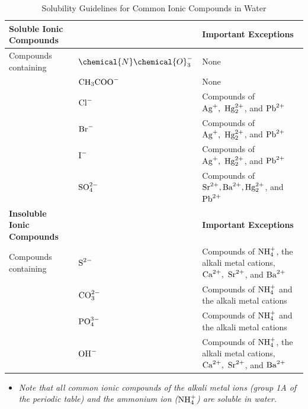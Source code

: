 \documentclass[
	chapter=4
]{chem122notes}
\begin{document}
\begin{table}[H]
	\centering
	\caption{Solubility Guidelines for Common Ionic Compounds in Water}
	\label{tab:ionic-compound-solubility-guidelines}
	\begin{tabular}{l l l}
		\textbf{Soluble Ionic Compounds} & & \textbf{Important Exceptions}\\
		\hline
		Compounds containing & $\chemical{N}\chemical{O}_{3}^{-}$ & None\\
		 & $\element{C}\element{H}[3]\element{C}\element{O}\element{O}^{-}$ & None\\
		 & $\element{Cl}^{-}$ & Compounds of $\element{Ag}^{+},\ \element{Hg}[2]^{2+}$, and $\element{Pb}^{2+}$\\
		 & $\element{Br}^{-}$ & Compounds of $\element{Ag}^{+},\ \element{Hg}[2]^{2+}$, and $\element{Pb}^{2+}$\\
		 & $\element{I}^{-}$ & Compounds of $\element{Ag}^{+},\ \element{Hg}[2]^{2+}$, and $\element{Pb}^{2+}$\\
		 & $\element{S}\element{O}[4]^{2-}$ & Compounds of $\element{Sr}^{2+}, \element{Ba}^{2+}, \element{Hg}[2]^{2+}$, and $\element{Pb}^{2+}$\\
		\hline
		\textbf{Insoluble Ionic Compounds} & & \textbf{Important Exceptions}\\
		\hline
		Compounds containing & $\element{S}^{2-}$ & Compounds of $\element{N}\element{H}_{4}^{+}$, the alkali metal cations, $\element{Ca}^{2+},\ \element{Sr}^{2+}$, and $\element{Ba}^{2+}$\\
		& $\element{C}\element{O}[3]^{2-}$ & Compounds of $\element{N}\element{H}_{4}^{+}$ and the alkali metal cations\\
		& $\element{P}\element{O}[4]^{3-}$ & Compounds of $\element{N}\element{H}_{4}^{+}$ and the alkali metal cations\\
		& $\element{O}\element{H}^{-}$ & Compounds of $\element{N}\element{H}_{4}^{+}$, the alkali metal cations, $\element{Ca}^{2+},\ \element{Sr}^{2+}$, and $\element{Ba}^{2+}$\\
		\hline %
	\end{tabular}
\end{table}
\begin{itemize}
	\item \emph{Note that all common ionic compounds of the alkali metal ions (group 1A of the periodic table) and the ammonium ion ($\element{N}\element{H}_{4}^{+}$) are soluble in water.}
\end{itemize}
\end{document}
